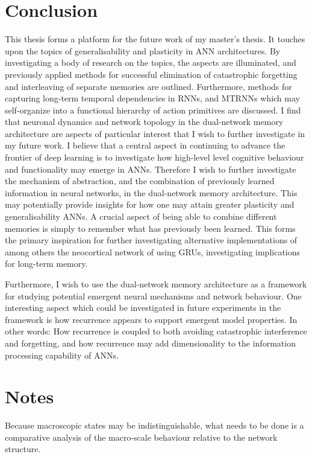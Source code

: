 \section{Conclusion}

This thesis forms a platform for the future work of my master's thesis. It touches upon the topics of generalisability and plasticity in ANN architectures. By investigating a body of research on the topics, the aspects are illuminated, and previously applied methods for successful elimination of catastrophic forgetting and interleaving of separate memories are outlined. Furthermore, methods for capturing long-term temporal dependencies in RNNs, and MTRNNs which may self-organize into a functional hierarchy of action primitives are discussed. 
I find that neuronal dynamics and network topology in the dual-network memory architecture are aspects of particular interest that I wish to further investigate in my future work. 
I believe that a central aspect in continuing to advance the frontier of deep learning is to investigate how high-level level cognitive behaviour and functionality may emerge in ANNs. Therefore I wish to further investigate the mechanism of abstraction, and the combination of previously learned information in neural networks, in the dual-network memory architecture. This may potentially provide insights for how one may attain greater plasticity and generalisability ANNs. 
A crucial aspect of being able to combine different memories is simply to remember what has previously been learned. This forms the primary inspiration for further investigating alternative implementations of among others the neocortical network of \cite{Hattori2014} using GRUs, investigating implications for long-term memory.

Furthermore, I wish to use the dual-network memory architecture as a framework for studying potential emergent neural mechanisms and network behaviour.
One interesting aspect which could be investigated in future experiments in the framework is how recurrence appears to support emergent model properties. In other words: How recurrence is coupled to both avoiding catastrophic interference and forgetting, and how recurrence may add dimensionality to the information processing capability of ANNs.

\section{Notes}

Because macroscopic states may be indistinguishable, what needs to be done is a comparative analysis of the macro-scale behaviour relative to the network structure.

\cleardoublepage